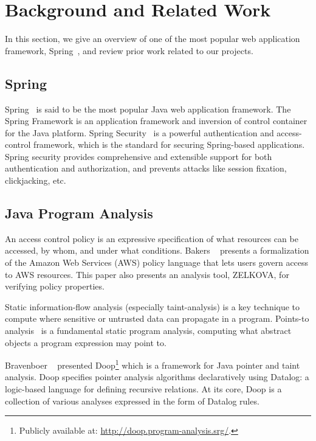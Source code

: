 \section{Background and Related Work} %
In this section, we give an overview of one of the most popular web application
framework, Spring~\cite{spring+security:home}, and review prior work related to
our projects.

\subsection{Spring}

Spring~\cite{spring+security:home} is said to be the most popular Java web
application framework.
%
The Spring Framework is an application framework and inversion of control
container for the Java platform.
%
Spring Security~\cite{spring+security:method} is a powerful authentication and
access-control framework, which is the standard for securing Spring-based
applications.
%
Spring security provides comprehensive and extensible support for both
authentication and authorization, and prevents attacks like session fixation,
clickjacking, etc.

\subsection{Java Program Analysis}

An access control policy is an expressive specification of what resources can be
accessed, by whom, and under what conditions.
%
Bakers \etal~\cite{Backes+etal:2018:Zelkova} presents a formalization of the
Amazon Web Services (AWS) policy language  that lets users govern access to AWS
resources. This paper also presents an analysis tool, ZELKOVA, for verifying
policy properties.

Static information-flow analysis (especially taint-analysis) is a key technique
to compute where sensitive or untrusted data can propagate in a program.
Points-to analysis~\cite{10.1145/3133926} is a fundamental static program
analysis, computing what abstract objects a program expression may point to.

Bravenboer \etal~\cite{Bravenboer:2009:Doop} presented Doop\footnote{Publicly
  available at: \url{http://doop.program-analysis.srg/}.} which is a framework
for Java pointer and taint analysis.
%
Doop specifies pointer analysis algorithms declaratively using Datalog: a
logic-based language for defining recursive relations.
%
At its core, Doop is a collection of various analyses expressed in the form of
Datalog rules.

